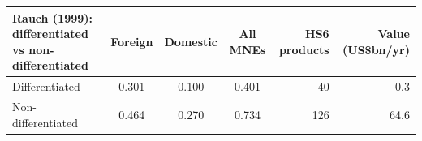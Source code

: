 \begin{tabular}{lcccrr}
\toprule
Rauch (1999): differentiated vs non-differentiated & Foreign & Domestic & All MNEs & HS6 products & Value (US\$bn/yr) \\
\midrule
Differentiated & 0.301 & 0.100 & 0.401 & 40 & 0.3 \\
Non-differentiated & 0.464 & 0.270 & 0.734 & 126 & 64.6 \\
\bottomrule
\end{tabular}
